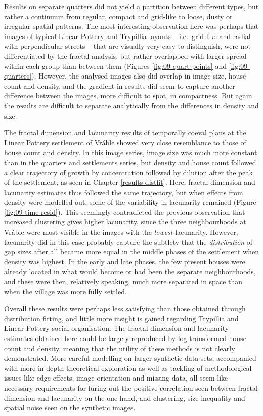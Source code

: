 \documentclass[
  12pt,
]{book}
\begin{document}
Results on separate quarters did not yield a partition between different types, but rather a continuum from regular, compact and grid-like to loose, dusty or irregular spatial patterns. The most interesting observation here was perhaps that images of typical Linear Pottery and Trypillia layouts -- i.e.~grid-like and radial with perpendicular streets -- that are visually very easy to distinguish, were not differentiated by the fractal analysis, but rather overlapped with larger spread within each group than between them (Figures \ref{fig:09-quart-points} and \ref{fig:09-quarters}). However, the analysed images also did overlap in image size, house count and density, and the gradient in results did seem to capture another difference between the images, more difficult to spot, in compactness. But again the results are difficult to separate analytically from the differences in density and size.

The fractal dimension and lacunarity results of temporally coeval plans at the Linear Pottery settlement of Vráble showed very close resemblance to those of house count and density. In this image series, image size was much more constant than in the quarters and settlements series, but density and house count followed a clear trajectory of growth by concentration followed by dilution after the peak of the settlement, as seen in Chapter \ref{results-distfit}. Here, fractal dimension and lacunarity estimates thus followed the same trajectory, but when effects from density were modelled out, some of the variability in lacunarity remained (Figure \ref{fig:09-time-resid}). This seemingly contradicted the previous observation that increased clustering gives higher lacunarity, since the three neighbourhoods at Vráble were most visible in the images with the \emph{lowest} lacunarity. However, lacunarity did in this case probably capture the subtlety that the \emph{distribution} of gap sizes after all became more equal in the middle phases of the settlement when density was highest. In the early and late phases, the few present houses were already located in what would become or had been the separate neighbourhoods, and these were then, relatively speaking, much more separated in space than when the village was more fully settled.

Overall these results were perhaps less satisfying than those obtained through distribution fitting, and little more insight is gained regarding Trypillia and Linear Pottery social organisation. The fractal dimension and lacunarity estimates obtained here could be largely reproduced by log-transformed house count and density, meaning that the utility of these methods is not clearly demonstrated. More careful modelling on larger synthetic data sets, accompanied with more in-depth theoretical exploration as well as tackling of methodological issues like edge effects, image orientation and missing data, all seem like necessary requirements for luring out the positive correlation seen between fractal dimension and lacunarity on the one hand, and clustering, size inequality and spatial noise seen on the synthetic images.
\end{document}
